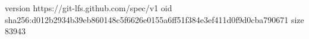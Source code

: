 version https://git-lfs.github.com/spec/v1
oid sha256:d012b2934b39eb860148c5f6626e0155a6ff51f384e3ef411d0f9d0cba790671
size 83943
